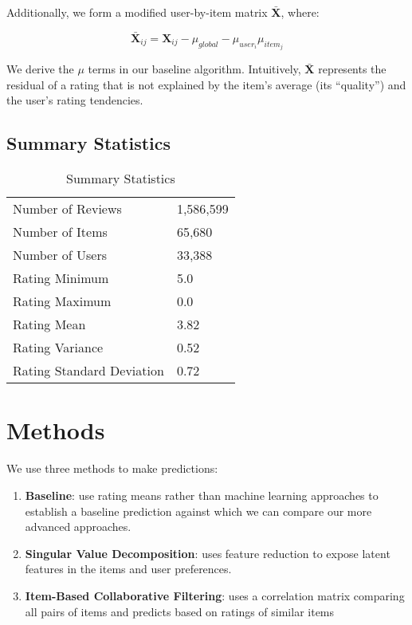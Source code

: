 \documentclass[12pt]{article}
\begin{document}
Additionally, we form a modified user-by-item matrix $\mathbf{\bar X}$, where:

$$ \mathbf{\bar X}_{ij} = \mathbf{X}_{ij} - \mu_{global} - \mu_{user_i} \mu_{item_j}$$

We derive the $\mu$ terms in our baseline algorithm. Intuitively, $\mathbf{\bar X}$ represents the residual of a rating that is not explained by the item's average (its ``quality'') and the user's rating tendencies.

\subsection{Summary Statistics}

\begin{table}[ht!]
\centering
\caption{Summary Statistics}
\begin{tabular}{ll}
\hline
Number of Reviews         & 1,586,599 \\
Number of Items           & 65,680    \\
Number of Users           & 33,388    \\
Rating Minimum            & 5.0       \\
Rating Maximum            & 0.0       \\
Rating Mean               & 3.82      \\
Rating Variance           & 0.52      \\
Rating Standard Deviation & 0.72      \\ \hline
\end{tabular}
\end{table}


\section{Methods}
We use three methods to make predictions:

\begin{enumerate}
  \item \textbf{Baseline}: use rating means rather than machine learning approaches to establish a baseline prediction against which we can compare our more advanced approaches.
  \item \textbf{Singular Value Decomposition}: uses feature reduction to expose latent features in the items and user preferences.
  \item \textbf{Item-Based Collaborative Filtering}: uses a correlation matrix comparing all pairs of items and predicts based on ratings of similar items
\end{enumerate}
\end{document}

